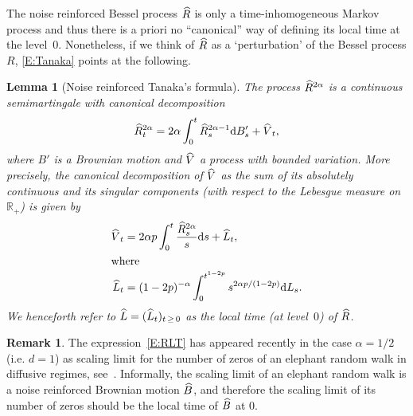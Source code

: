 \documentclass[10pt]{amsart}
\newtheorem{lemm}[theo]{Lemma}\newtheorem{prop}[theo]{Proposition}\newtheorem{coro}[theo]{Corollary}\newtheorem{conj}[theo]{Conjecture}
\theoremstyle{definition}\newtheorem{defi}[theo]{Definition}\newtheorem{rema}[theo]{Remark}\newtheorem{exam}[theo]{Example}\newtheorem{exem}[theo]{Example}\newtheorem{nota}[theo]{Notation}
\renewcommand{\hat}[1]{\widehat{#1}}
\newcommand{\dd}{\mathrm{d}}
\newcommand{\R}{\mathbb{R}}
\let\oldhat\hat
\renewcommand*{\hat}[1]{\mathchoice{\widehat{#1}}{\widehat{#1}}{\oldhat{#1}}{\oldhat{#1}}}
\begin{document}
The noise reinforced Bessel process $\hat R$ is only a time-inhomogeneous Markov process and thus there is a priori no ``canonical'' way of defining its local time at the level~$0$. Nonetheless, if we think of $\hat R$ as a `perturbation' of the Bessel process $R$, \eqref{E:Tanaka} points at the following.


\begin{lemm}[Noise reinforced Tanaka's formula] \label{L1}
The process $\hat R^{2\alpha}$ is a continuous semimartingale with canonical decomposition
\[
\hat R_t^{2\alpha}= 2\alpha \int_0^{t} \hat R^{2\alpha-1}_s \dd B'_s + \hat V_t,
\]
where $B'$ is a Brownian motion and $\hat V$ a process with bounded variation. More precisely, the canonical decomposition of $\hat V$ as the sum of its absolutely continuous and its singular components (with respect to the Lebesgue measure on $\R_+$) is given by
\begin{align}
\hat V_t &= 2\alpha p \int_0^{t} \frac{\hat R^{2\alpha}_s}{s} \dd s + \hat{L}_t,\nonumber
\\
\intertext{where}
\hat{L}_t &= (1-2p)^{-\alpha} \int_0^{t^{1-2p}} s^{2\alpha p/(1-2p)} \dd {L}_s.\label{E:RLT}
\end{align}
We henceforth refer to $\hat{L}=(\hat{L}_t)_{t\,\geq\,0}$ as the local time (at level~$0$) of $\hat R$.
\end{lemm}

\begin{rema}
The expression~\eqref{E:RLT} has appeared recently in the case $\alpha = 1/2$ (i.e. $d=1$) as scaling limit for the number of zeros of an elephant random walk in diffusive regimes, see~\cite[Theorem~3.1]{Zero}. Informally, the scaling limit of an elephant random walk is a noise reinforced Brownian motion $\hat B$, and therefore the scaling limit of its number of zeros should be the local time of $\hat B$ at $0$.
\end{rema}
\end{document}
